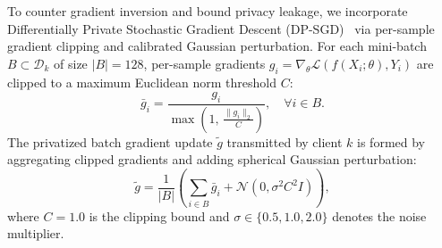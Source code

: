 \documentclass[journal]{IEEEtran}
\begin{document}
To counter gradient inversion and bound privacy leakage, we incorporate Differentially Private Stochastic Gradient Descent (DP-SGD)~\cite{abadi2016deep} via per-sample gradient clipping and calibrated Gaussian perturbation. For each mini-batch $B \subset \mathcal{D}_k$ of size $|B|=128$, per-sample gradients $g_i = \nabla_\theta \mathcal{L}(f(X_i; \theta), Y_i)$ are clipped to a maximum Euclidean norm threshold $C$:
\begin{equation}
\bar{g}_i = \frac{g_i}{\max\left(1, \, \frac{\|g_i\|_2}{C}\right)}, \quad \forall i \in B.
\label{eq:dp_clip}
\end{equation}
The privatized batch gradient update $\tilde{g}$ transmitted by client $k$ is formed by aggregating clipped gradients and adding spherical Gaussian perturbation:
\begin{equation}
\tilde{g} = \frac{1}{|B|} \left( \sum_{i \in B} \bar{g}_i + \mathcal{N}\left(0, \sigma^2 C^2 I\right) \right),
\label{eq:dp_sgd}
\end{equation}
where $C = 1.0$ is the clipping bound and $\sigma \in \{0.5, 1.0, 2.0\}$ denotes the noise multiplier.
\end{document}
